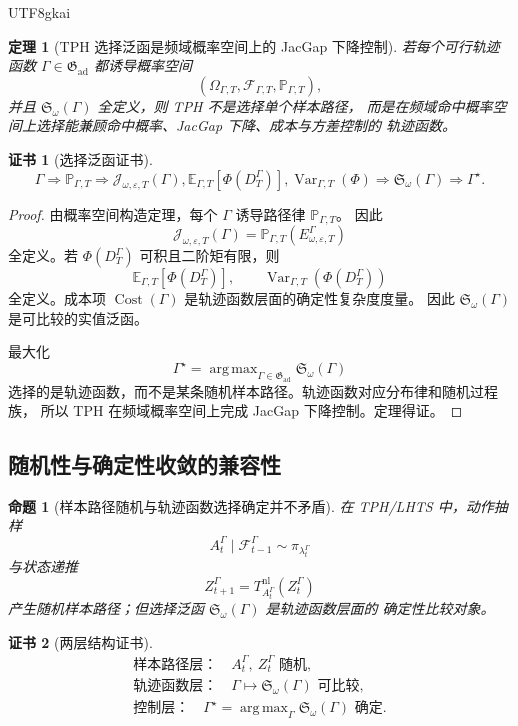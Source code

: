 \documentclass[12pt]{article}
\newtheorem{theorem}{定理}[section]
\newtheorem{proposition}{命题}[section]
\newtheorem{Certificate}{证书}[section]
\newcommand{\Prob}{\mathbb P}
\newcommand{\E}{\mathbb E}
\newcommand{\Fil}{\mathcal F}
\DeclareMathOperator{\Cost}{Cost}
\DeclareMathOperator{\Var}{Var}
\DeclareMathOperator*{\argmax}{arg\,max}
\begin{document}
\begin{CJK*}{UTF8}{gkai}
\begin{theorem}[TPH 选择泛函是频域概率空间上的 JacGap 下降控制]
若每个可行轨迹函数 \(\Gamma\in\mathfrak G_{\mathrm{ad}}\) 都诱导概率空间
\[
(\Omega_{\Gamma,T},\mathscr F_{\Gamma,T},\Prob_{\Gamma,T}),
\]
并且 \(\mathfrak S_\omega(\Gamma)\) 全定义，则 TPH 不是选择单个样本路径，
而是在频域命中概率空间上选择能兼顾命中概率、JacGap 下降、成本与方差控制的
轨迹函数。
\end{theorem}

\begin{Certificate}[选择泛函证书]
\[
\boxed{
\Gamma
\Rightarrow
\Prob_{\Gamma,T}
\Rightarrow
\mathcal J_{\omega,\varepsilon,T}(\Gamma),
\E_{\Gamma,T}[\Phi(D_T^\Gamma)],
\Var_{\Gamma,T}(\Phi)
\Rightarrow
\mathfrak S_\omega(\Gamma)
\Rightarrow
\Gamma^\star.
}
\]
\end{Certificate}

\begin{proof}
由概率空间构造定理，每个 \(\Gamma\) 诱导路径律 \(\Prob_{\Gamma,T}\)。
因此
\[
\mathcal J_{\omega,\varepsilon,T}(\Gamma)
=
\Prob_{\Gamma,T}(E_{\omega,\varepsilon,T}^{\Gamma})
\]
全定义。若 \(\Phi(D_T^\Gamma)\) 可积且二阶矩有限，则
\[
\E_{\Gamma,T}[\Phi(D_T^\Gamma)],
\qquad
\Var_{\Gamma,T}(\Phi(D_T^\Gamma))
\]
全定义。成本项 \(\Cost(\Gamma)\) 是轨迹函数层面的确定性复杂度度量。
因此 \(\mathfrak S_\omega(\Gamma)\) 是可比较的实值泛函。

最大化
\[
\Gamma^\star
=
\argmax_{\Gamma\in\mathfrak G_{\mathrm{ad}}}
\mathfrak S_\omega(\Gamma)
\]
选择的是轨迹函数，而不是某条随机样本路径。轨迹函数对应分布律和随机过程族，
所以 TPH 在频域概率空间上完成 JacGap 下降控制。定理得证。
\end{proof}

\subsection{随机性与确定性收敛的兼容性}
\label{subsec:randomness-deterministic-frequency-control}

\begin{proposition}[样本路径随机与轨迹函数选择确定并不矛盾]
在 TPH/LHTS 中，动作抽样
\[
A_t^\Gamma\mid\Fil_{t-1}^{\Gamma}\sim\pi_{\lambda_t^\Gamma}
\]
与状态递推
\[
Z_{t+1}^\Gamma=T_{A_t^\Gamma}^{\mathrm{nl}}(Z_t^\Gamma)
\]
产生随机样本路径；但选择泛函 \(\mathfrak S_\omega(\Gamma)\) 是轨迹函数层面的
确定性比较对象。
\end{proposition}

\begin{Certificate}[两层结构证书]
\[
\boxed{
\begin{gathered}
\text{样本路径层：}\quad
A_t^\Gamma,\ Z_t^\Gamma\text{ 随机},
\\
\text{轨迹函数层：}\quad
\Gamma\mapsto\mathfrak S_\omega(\Gamma)\text{ 可比较},
\\
\text{控制层：}\quad
\Gamma^\star=\argmax_{\Gamma}\mathfrak S_\omega(\Gamma)\text{ 确定}.
\end{gathered}
}
\]
\end{Certificate}


\end{CJK*}
\end{document}
